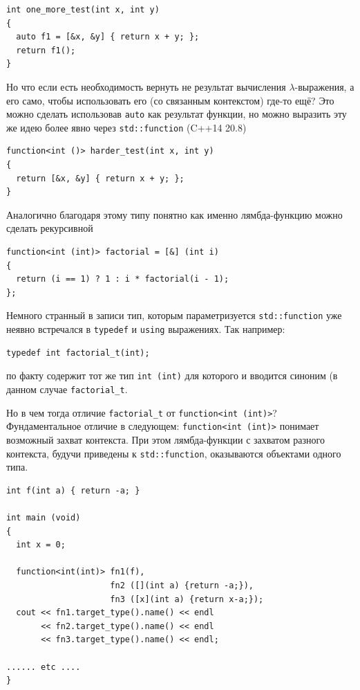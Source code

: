 \documentclass[a4paper,12pt,oneside]{article}
\begin{document}
\begin{lstlisting}
int one_more_test(int x, int y)
{
  auto f1 = [&x, &y] { return x + y; };
  return f1(); 
}
\end{lstlisting}

Но что если есть необходимость вернуть не результат вычисления $\lambda$-выражения, а его само, чтобы использовать его (со связанным контекстом) где-то ещё? Это можно сделать использовав \lstinline!auto! как результат функции, но можно выразить эту же идею более явно через \lstinline!std::function! (C++14 20.8)
 
\begin{lstlisting}
function<int ()> harder_test(int x, int y)
{
  return [&x, &y] { return x + y; };
}
\end{lstlisting}

Аналогично благодаря этому типу понятно как именно лямбда-функцию можно сделать рекурсивной

\begin{lstlisting}
function<int (int)> factorial = [&] (int i) 
{ 
  return (i == 1) ? 1 : i * factorial(i - 1); 
};
\end{lstlisting}

Немного странный в записи тип, которым параметризуется \lstinline!std::function! уже неявно встречался в \lstinline!typedef! и \lstinline!using! выражениях. Так например:

\begin{lstlisting}
typedef int factorial_t(int);
\end{lstlisting}

по факту содержит тот же тип \lstinline!int (int)! для которого и вводится синоним (в данном случае \lstinline!factorial_t!.

Но в чем тогда отличие \lstinline!factorial_t! от \lstinline!function<int (int)>!? Фундаментальное отличие в следующем: \lstinline!function<int (int)>! понимает возможный захват контекста. При этом лямбда-функции с захватом разного контекста, будучи приведены к \lstinline!std::function!, оказываются объектами одного типа.

\begin{lstlisting}
int f(int a) { return -a; }

int main (void)
{
  int x = 0;

  function<int(int)> fn1(f),
                     fn2 ([](int a) {return -a;}),
                     fn3 ([x](int a) {return x-a;});
  cout << fn1.target_type().name() << endl
       << fn2.target_type().name() << endl
       << fn3.target_type().name() << endl;

...... etc ....
}
\end{lstlisting}
\end{document}
